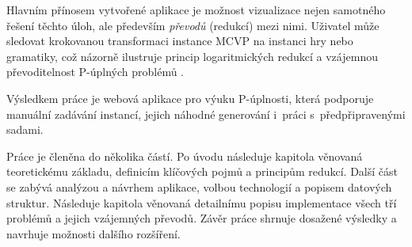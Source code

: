 Hlavním přínosem vytvořené aplikace je možnost vizualizace nejen samotného řešení těchto úloh, ale především \emph{převodů} (redukcí) mezi nimi. Uživatel může sledovat krokovanou transformaci instance MCVP na instanci hry nebo gramatiky, což názorně ilustruje princip logaritmických redukcí a vzájemnou převoditelnost P-úplných problémů \cite{sawa}.

Výsledkem práce je webová aplikace pro výuku P-úplnosti, která podporuje manuální zadávání instancí, jejich náhodné generování i~práci s~předpřipravenými sadami.

Práce je členěna do několika částí. Po úvodu následuje kapitola věnovaná teoretickému základu, definicím klíčových pojmů a principům redukcí. Další část se zabývá analýzou a návrhem aplikace, volbou technologií a popisem datových struktur. Následuje kapitola věnovaná detailnímu popisu implementace všech tří problémů a jejich vzájemných převodů. Závěr práce shrnuje dosažené výsledky a navrhuje možnosti dalšího rozšíření.

\endinput